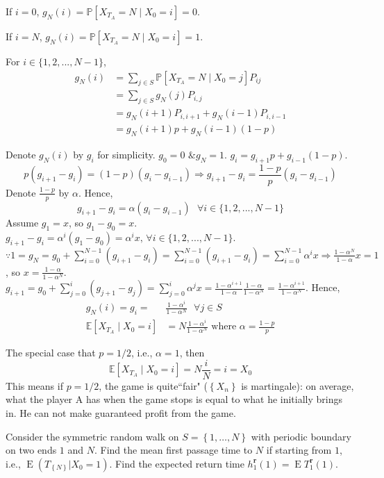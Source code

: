 \documentclass[  11pt]{article}
\newcommand{\e}{ \operatorname{E}}
\newcommand{\set}[1]{\left\{#1\right\}}
\newcommand{\rt}{{\textbf{r}}}
\begin{document}
\begin{ExerciseList}
If $i = 0$, $g_{N}(i) = \mathbb{P}[X_{T_A} = N \mid X_0 = i] = 0$.\par
If $i = N$, $g_{N}(i) = \mathbb{P}[X_{T_A} = N \mid X_0 = i] = 1$.\par
For $i\in \{1,2,...,N-1\}$,
\[\begin{split}
g_{N}(i) & = \sum_{j\in S} \mathbb{P}[X_{T_A} = N \mid X_0 = j]P_{ij} \\
& = \sum_{j\in S} g_{N}(j)P_{i,j}\\
& = g_{N}(i+1) P_{i,i+1} + g_{N}(i-1) P_{i,i-1} \\
& = g_{N}(i+1) p + g_{N}(i-1)(1-p)
\end{split}\]

Denote $g_{N}(i) $ by $g_{i}$ for simplicity. $g_{0} = 0 
\text{ \& } g_{N} = 1$. $g_i = g_{i+1}p+g_{i-1}(1-p)$.
\[ p(g_{i+1} -g_{i}) = (1-p)(g_i - g_{i-1}) \Rightarrow g_{i+1} - g_{i} = \frac{1-p}{p} (g_i - g_{i-1})\] Denote $\frac{1-p}{p}$ by $\alpha$. Hence, 
\[g_{i+1} - g_{i} = \alpha (g_i - g_{i-1}) \text{ }\forall i \in \{1,2,...,N-1\} \]
Assume $g_1 = x$, so $g_1 - g_0 = x$. $g_{i+1} - g_{i} = \alpha^{i} (g_1-g_0) = \alpha^{i} x \text{, } \forall i \in \{1,2,...,N-1\}$. $\because 1 = g_{N} = g_0 + \sum_{i=0}^{N-1} (g_{i+1}-g_{i}) = \sum_{i=0}^{N-1} (g_{i+1}-g_{i}) = \sum_{i=0}^{N-1} \alpha^{i} x \Rightarrow \frac{1-\alpha^N}{1-\alpha} x = 1$, so $x =  \frac{1-\alpha}{1-\alpha^N}$. $g_{i+1} = g_{0} + \sum_{j=0}^{i} (g_{j+1}-g_{j}) = \sum_{j=0}^{i} \alpha^{j}x = \frac{1-\alpha^{i+1}}{1-\alpha}\frac{1-\alpha}{1-\alpha^N} = \frac{1-\alpha^{i+1}}{1-\alpha^{N}}$. Hence,
\[\begin{split}
g_{N}(i) = g_{i} = & \frac{1-\alpha^i}{1-\alpha^N}\text{ }\forall j \in S \\
\mathbb{E}[X_{T_A} \mid X_0 = i] & = N\frac{1-\alpha^i}{1-\alpha^N} \text{ where } \alpha = \frac{1-p}{p}
\end{split}
\]

The special case that $p=1/2$, i.e., $\alpha=1$, then
\[
\mathbb{E}[X_{T_A} \mid X_0 = i]  = N\frac{i}{ N} = i =X_0
\]
This means if $p=1/2$, the game is quite``fair"
($\set{X_n}$ is martingale):  on average,
what the player A has when the game stops is equal to what he initially brings in.
He can not  make guaranteed profit from the game. 

\Exercise

Consider the symmetric random walk on $S=\set{1,\ldots,N}$ with periodic boundary on two ends
$1$ and $N$. Find the mean first passage time to $N$ if starting from $1$, i.e.,
 $\e( T_{\set{N}}  | X_0=1)$.
 Find the expected return time $h_1^\rt(1)=\e T^\rt_1(1)$.



\end{ExerciseList}
\end{document}
